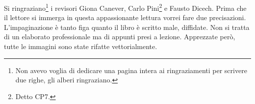 %
%
%

\preface
Si ringraziano\footnote{Non avevo voglia di dedicare una pagina intera ai ringraziamenti per scrivere due righe, gli alberi ringraziano.} i revisori Giona Canever, Carlo Pini\footnote{Detto CP7.} e Fausto Dicech. Prima che il lettore si immerga in questa appassionante lettura vorrei fare due precisazioni. L'impaginazione è tanto figa quanto il libro è scritto male, diffidate. Non si tratta di un elaborato professionale ma di appunti presi a lezione. Apprezzate però, tutte le immagini sono state rifatte vettorialmente. 

